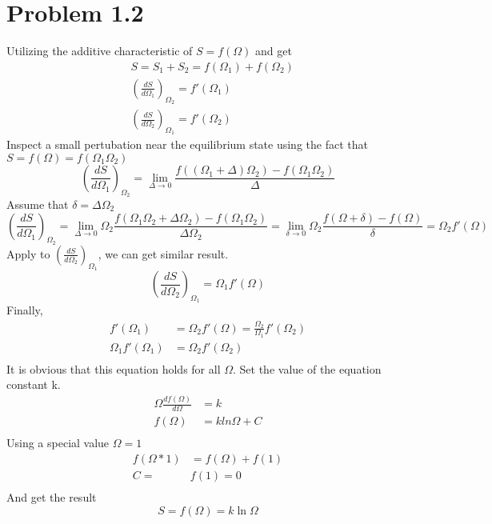 \documentclass{article}
\begin{document}
\section*{Problem 1.2}
Utilizing the additive characteristic of $S=f(\Omega)$ and get
\begin{align}
&S=S_1+S_2=f(\Omega_1)+f(\Omega_2)\\
&(\frac{dS}{d\Omega_1})_{\Omega_2}=f'(\Omega_1)\\
&(\frac{dS}{d\Omega_2})_{\Omega_1}=f'(\Omega_2)
\end{align}
Inspect a small pertubation near the equilibrium state using the fact that $S=f(\Omega)=f(\Omega_1\Omega_2)$
\begin{equation}
(\frac{dS}{d\Omega_1})_{\Omega_2}=\lim_{\Delta\rightarrow 0}{\frac{f((\Omega_1+\Delta)\Omega_2)-f(\Omega_1\Omega_2)}{\Delta}}
\end{equation}
Assume that $\delta=\Delta\Omega_2$
\begin{equation}
(\frac{dS}{d\Omega_1})_{\Omega_2}=\lim_{\Delta\rightarrow 0}{\Omega_2\frac{f(\Omega_1\Omega_2+\Delta\Omega_2)-f(\Omega_1\Omega_2)}{\Delta\Omega_2}}=\lim_{\delta\rightarrow 0}{\Omega_2\frac{f(\Omega+\delta)-f(\Omega)}{\delta}}=\Omega_2f'(\Omega)
\end{equation}
Apply to $(\frac{dS}{d\Omega_2})_{\Omega_1}$, we can get similar result.
\begin{equation}
(\frac{dS}{d\Omega_2})_{\Omega_1}=\Omega_1f'(\Omega)
\end{equation}
Finally,
\begin{align}
f'(\Omega_1)&=\Omega_2f'(\Omega)=\frac{\Omega_2}{\Omega_1}f'(\Omega_2)\\
\Omega_1f'(\Omega_1)&=\Omega_2f'(\Omega_2)\\
\end{align}
It is obvious that this equation holds for all $\Omega$. Set the value of the equation constant k.
\begin{align}
\Omega\frac{df(\Omega)}{d\Omega}&=k\\
f(\Omega)&=kln\Omega+C\\
\end{align}
Using a special value $\Omega=1$
\begin{align}
f(\Omega*1)&=f(\Omega)+f(1)\\
C=&f(1)=0\\
\end{align}
And get the result
\begin{equation}
S=f(\Omega)=k\ln\Omega
\end{equation}
\end{document}
